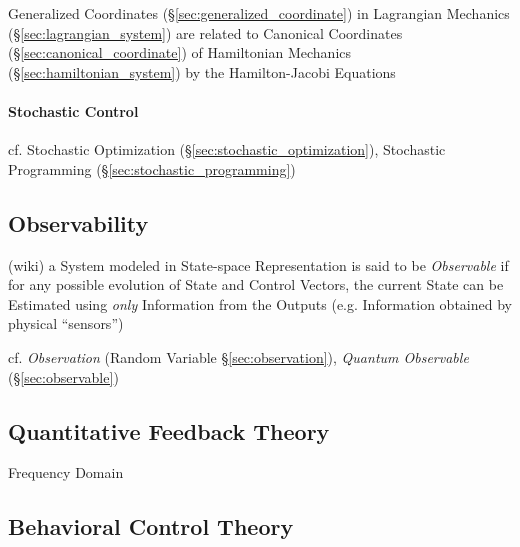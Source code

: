 Generalized Coordinates (\S\ref{sec:generalized_coordinate}) in Lagrangian
Mechanics (\S\ref{sec:lagrangian_system}) are related to Canonical Coordinates
(\S\ref{sec:canonical_coordinate}) of Hamiltonian Mechanics
(\S\ref{sec:hamiltonian_system}) by the Hamilton-Jacobi Equations



\paragraph{Stochastic Control}\label{sec:stochastic_control}\hfill

cf. Stochastic Optimization (\S\ref{sec:stochastic_optimization}),
Stochastic Programming (\S\ref{sec:stochastic_programming})



\subsection{Observability}\label{sec:observability}

(wiki) a System modeled in State-space Representation is said to be
\emph{Observable} if for any possible evolution of State and Control Vectors,
the current State can be Estimated using \emph{only} Information from the
Outputs (e.g. Information obtained by physical ``sensors'')

cf. \emph{Observation} (Random Variable \S\ref{sec:observation}),
\emph{Quantum Observable} (\S\ref{sec:observable})



\subsection{Quantitative Feedback Theory}\label{sec:quantitative_feedback}

Frequency Domain



\subsection{Behavioral Control Theory}\label{sec:behavioral_control}

